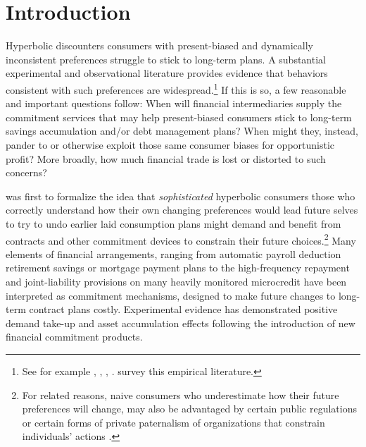 \documentclass[11pt,english]{article}
\theoremstyle{plain}
\theoremstyle{definition}
\begin{document}
\section{Introduction}

Hyperbolic discounters \textendash{} consumers with present-biased
and dynamically inconsistent preferences \textendash{} struggle to
stick to long-term plans. A substantial experimental and observational
literature provides evidence that behaviors consistent with such preferences
are widespread.\footnote{See for example \citet{ariely_procrastination_2002}, \citet{thaler2004},
\citet{ashraf_tying_2006}, \citet{bauer_behavioral_2012}. \citet{bryan2010}
survey this empirical literature.} If this is so, a few reasonable and important questions follow: When will financial intermediaries supply the commitment services
that may help present-biased consumers stick to long-term savings
accumulation and/or debt management plans? When might they, instead,
pander to or otherwise exploit
those same consumer biases
for opportunistic profit? More broadly, how much financial trade
is lost or distorted to such concerns?

\citet{strotz1956} was first to formalize the idea that \emph{sophisticated}
hyperbolic consumers \textendash{} those who correctly understand
how their own changing preferences would lead future selves to try
to undo earlier laid consumption plans \textendash{} might demand
and benefit from contracts and other commitment devices to constrain
their future choices.\footnote{For related reasons, naive consumers who underestimate how their future
preferences will change, may also be advantaged by certain public
regulations or certain forms of private paternalism of organizations
that constrain individuals' actions \citep{spiegler2011}.} Many elements of financial arrangements, ranging from automatic payroll
deduction retirement savings or mortgage payment plans to the high-frequency
repayment and joint-liability provisions on many heavily monitored microcredit have  been interpreted as commitment mechanisms, designed
to make future changes to long-term contract plans costly. Experimental
evidence has demonstrated
positive demand take-up and asset accumulation effects following the
introduction of new financial commitment products. 
\end{document}
